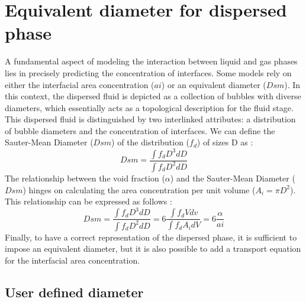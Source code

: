 \section{Equivalent diameter for dispersed phase\label{sec:diam-mgmt}}
\label{sec:IATE}
A fundamental aspect of modeling the interaction between liquid and gas phases lies in precisely predicting the concentration of interfaces. Some models rely on either the interfacial area concentration ($ai$) or an equivalent diameter ($Dsm$). In this context, the dispersed fluid is depicted as a collection of bubbles with diverse diameters, which essentially acts as a topological description for the fluid stage. This dispersed fluid is distinguished by two interlinked attributes: a distribution of bubble diameters and the concentration of interfaces. We can define the Sauter-Mean Diameter ($Dsm$) of the distribution ($f_d$) of sizes D as :
\begin{equation}
Dsm=\frac{\int f_dD^3 dD}{\int f_d D^2 dD}
\end{equation}
The relationship between the void fraction ($\alpha$) and the Sauter-Mean Diameter ($Dsm$)  hinges on calculating the area concentration per unit volume ($A_i=\pi D^2$). This relationship can be expressed as follows :
\begin{equation}
Dsm=\frac{\int f_dD^3 dD}{\int f_d D^2 dD}=6\frac{\int f_d V dv}{\int f_d A_i dV}=6\frac{\alpha}{ai}
\end{equation}
Finally, to have a correct representation of the dispersed phase, it is sufficient to impose an equivalent diameter, but it is also possible to add a transport equation for the interfacial area concentration.

\subsection{User defined diameter}\label{Dsmuserdefine}

%
